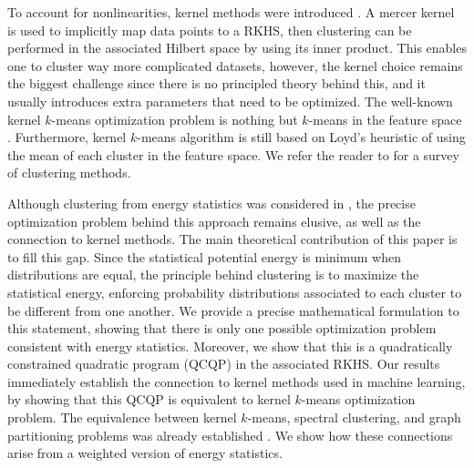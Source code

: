 \documentclass[aps,preprint,nofootinbib,floatfix]{revtex4-1}
\begin{document}
To account for nonlinearities, kernel methods were introduced 
\cite{Smola,Girolami}. A mercer kernel \cite{Mercer} is used to implicitly
map data points to a RKHS, then clustering can be performed in the associated
Hilbert
space by using its inner product. This enables one to cluster way more
complicated datasets, 
however, the kernel choice remains the biggest challenge
since there is no principled theory behind this, 
and it usually introduces
extra parameters that need to be optimized. 
The well-known
kernel $k$-means optimization problem is nothing but $k$-means in the
feature space \cite{Girolami}. Furthermore, kernel $k$-means algorithm
\cite{Dhillon2,Dhillon} is still based on Loyd's heuristic \cite{Lloyd} of
using the mean of each cluster in the feature space. 
We refer the reader to \cite{Filippone} for a survey of clustering
methods.

Although clustering from energy statistics was considered
in \cite{Kgroups}, the precise optimization problem behind this approach
remains elusive, as well as the connection to kernel methods.
The main theoretical contribution of this paper is to fill this gap.
Since the statistical potential energy is minimum when
distributions are equal, the
principle behind clustering is to maximize the statistical energy, 
enforcing probability distributions associated to each cluster
to be different from one another.
We provide a precise mathematical formulation to this
statement, showing that there is only one possible optimization problem
consistent with energy statistics. 
Moreover, we show that this is
a quadratically constrained
quadratic program (QCQP) in the associated RKHS. Our results immediately 
establish the connection 
to kernel methods used in machine learning, 
by showing that this QCQP is equivalent
to kernel $k$-means optimization problem. 
The equivalence between kernel $k$-means, 
spectral clustering, and graph partitioning problems was already established
\cite{Dhillon,Dhillon2}. We show how these connections arise
from a weighted version of energy statistics.
\end{document}
